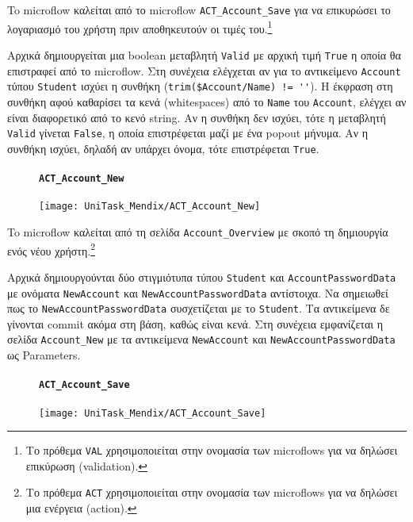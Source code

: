                     To microflow καλείται από το microflow \texttt{ACT\_Account\_Save} για να επικυρώσει το λογαριασμό του χρήστη πριν αποθηκευτούν οι τιμές του.\footnote{Το πρόθεμα \texttt{VAL} χρησιμοποιείται στην ονομασία των microflows για να δηλώσει επικύρωση (validation).}

                    Αρχικά δημιουργείται μια boolean μεταβλητή \texttt{Valid} με αρχική τιμή \texttt{True} η οποία θα επιστραφεί από το microflow. Στη συνέχεια ελέγχεται αν για το αντικείμενο \texttt{Account} τύπου \texttt{Student} ισχύει η συνθήκη (\verb|trim($Account/Name) != ''|). Η έκφραση στη συνθήκη αφού καθαρίσει τα κενά (whitespaces) από το \texttt{Name} του \texttt{Account}, ελέγχει αν είναι διαφορετικό από το κενό string. Αν η συνθήκη δεν ισχύει, τότε η μεταβλητή \texttt{Valid} γίνεται \texttt{False}, η οποία επιστρέφεται μαζί με ένα popout μήνυμα. Αν η συνθήκη ισχύει, δηλαδή αν υπάρχει όνομα, τότε επιστρέφεται \texttt{True}.

                \begin{figure}[H] \noindent
                    \paragraph{\texttt{ACT\_Account\_New}}
                    \begin{center}
                        \texttt{[image: UniTask\_Mendix/ACT\_Account\_New]}
                    \end{center}
                \end{figure}

                    To microflow καλείται από τη σελίδα \texttt{Account\_Overview} με σκοπό τη δημιουργία ενός νέου χρήστη.\footnote{Το πρόθεμα \texttt{ACT} χρησιμοποιείται στην ονομασία των microflows για να δηλώσει μια ενέργεια (action).}

                    Αρχικά δημιουργούνται δύο στιγμιότυπα τύπου \texttt{Student} και \texttt{AccountPasswordData} με ονόματα \texttt{NewAccount} και \texttt{NewAccountPasswordData} αντίστοιχα. Να σημειωθεί πως το \texttt{NewAccountPasswordData} συσχετίζεται με το \texttt{Student}. Τα αντικείμενα δε γίνονται commit ακόμα στη βάση, καθώς είναι κενά. Στη συνέχεια εμφανίζεται η σελίδα \texttt{Account\_New} με τα αντικείμενα \texttt{NewAccount} και \texttt{NewAccountPasswordData} ως Parameters.

                \begin{figure}[H] \noindent
                    \paragraph{\texttt{ACT\_Account\_Save}}
                    \begin{center}
                        \texttt{[image: UniTask\_Mendix/ACT\_Account\_Save]}
                    \end{center}
                \end{figure}

